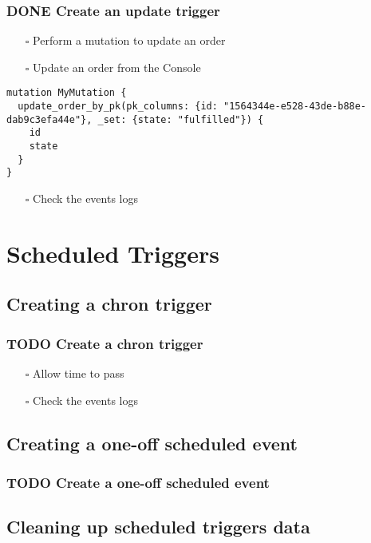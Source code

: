 \documentclass[11pt]{article}
\begin{document}
\subsubsection{{\bfseries\sffamily DONE} Create an update trigger}
\label{sec:org8373561}
\begin{itemize}
\item[{$\square$}] Perform a mutation to update an order
\item[{$\square$}] Update an order from the Console
\end{itemize}
\begin{verbatim}
mutation MyMutation {
  update_order_by_pk(pk_columns: {id: "1564344e-e528-43de-b88e-dab9c3efa44e"}, _set: {state: "fulfilled"}) {
    id
    state
  }
}
\end{verbatim}
\begin{itemize}
\item[{$\square$}] Check the events logs
\end{itemize}
\section{Scheduled Triggers}
\label{sec:orgc40938f}
\subsection{Creating a chron trigger}
\label{sec:org5db7765}
\subsubsection{{\bfseries\sffamily TODO} Create a chron trigger}
\label{sec:orgcfd18db}
\begin{itemize}
\item[{$\square$}] Allow time to pass
\item[{$\square$}] Check the events logs
\end{itemize}
\subsection{Creating a one-off scheduled event}
\label{sec:org6796172}
\subsubsection{{\bfseries\sffamily TODO} Create a one-off scheduled event}
\label{sec:orgc4dd55b}
\subsection{Cleaning up scheduled triggers data}
\label{sec:org5ffb846}
\end{document}
